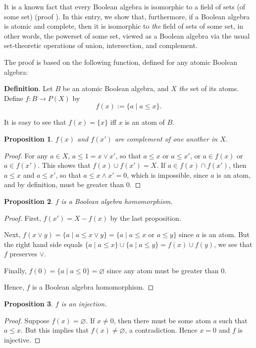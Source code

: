 \documentclass[12pt]{article}
\newtheorem{prop}{Proposition}
\begin{document}
It is a known fact that every Boolean algebra is isomorphic to a field of sets (of some set) (proof ).  In this entry, we show that, furthermore, if a Boolean algebra is atomic and complete, then it is isomorphic to \emph{the} field of sets of some set, in other words, the powerset of some set, viewed as a Boolean algebra via the usual set-theoretic operations of union, intersection, and complement.  

The proof is based on the following function, defined for any atomic Boolean algebra:

\textbf{Definition}.  Let $B$ be an atomic Boolean algebra, and $X$ \emph{the} set of its atoms.  Define $f: B\to P(X)$ by $$f(x):=\lbrace a \mid a\le x \rbrace.$$

It is easy to see that $f(x)=\lbrace x\rbrace$ iff $x$ is an atom of $B$.

\begin{prop} $f(x)$ and $f(x')$ are complement of one another in $X$. \end{prop}
\begin{proof}  For any $a\in X$, $a\le 1=x\vee x'$, so that $a\le x$ or $a\le x'$, or $a\in f(x)$ or $a\in f(x')$.  This shows that $f(x)\cup f(x')=X$.  If $a\in f(x)\cap f(x')$, then $a\le x$ and $a\le x'$, so that $a\le x\wedge x'=0$, which is impossible, since $a$ is an atom, and by definition, must be greater than $0$.
\end{proof}

\begin{prop} $f$ is a Boolean algebra homomorphism.  \end{prop}
\begin{proof} First, $f(x') = X-f(x)$ by the last proposition.

Next, $f(x\vee y)= \lbrace a \mid a\le x\vee y \rbrace = \lbrace a \mid a\le x \mbox{ or } a\le y\rbrace$ since $a$ is an atom.  But the right hand side equals $\lbrace a\mid a\le x\rbrace \cup \lbrace a\mid a\le y \rbrace = f(x)\cup f(y)$, we see that $f$ preserves $\vee$. 

Finally, $f(0)=\lbrace a\mid a\le 0\rbrace = \varnothing$ since any atom must be greater than $0$.

Hence, $f$ is a Boolean algebra homomorphism.
\end{proof}

\begin{prop} $f$ is an injection. \end{prop}
\begin{proof} Suppose $f(x)=\varnothing$.  If $x\ne 0$, then there must be some atom $a$ such that $a\le x$.  But this implies that $f(x)\ne \varnothing$, a contradiction.  Hence $x=0$ and $f$ is injective.  \end{proof}
\end{document}
